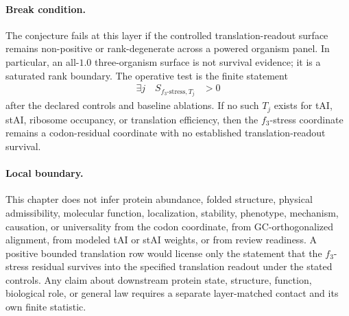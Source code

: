 \paragraph{Break condition.}
The conjecture fails at this layer if the controlled translation-readout surface remains non-positive or rank-degenerate across a powered organism panel.  In particular, an all-$1.0$ three-organism surface is not survival evidence; it is a saturated rank boundary.  The operative test is the finite statement
$$\begin{aligned}
\exists j\quad S_{f_3\text{-stress},T_j} &> 0
\end{aligned}$$
after the declared controls and baseline ablations.  If no such $T_j$ exists for tAI, stAI, ribosome occupancy, or translation efficiency, then the $f_3$-stress coordinate remains a codon-residual coordinate with no established translation-readout survival.

\paragraph{Local boundary.}
This chapter does not infer protein abundance, folded structure, physical admissibility, molecular function, localization, stability, phenotype, mechanism, causation, or universality from the codon coordinate, from GC-orthogonalized alignment, from modeled tAI or stAI weights, or from review readiness.  A positive bounded translation row would license only the statement that the $f_3$-stress residual survives into the specified translation readout under the stated controls.  Any claim about downstream protein state, structure, function, biological role, or general law requires a separate layer-matched contact and its own finite statistic.